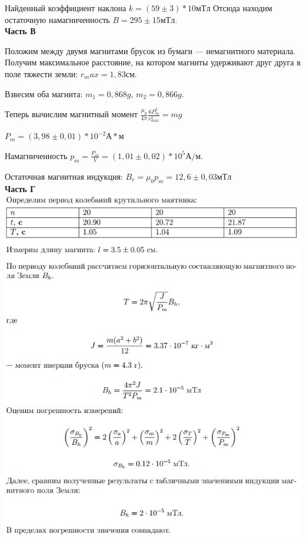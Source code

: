 \documentclass[12pt]{article}
\begin{document}
    Найденный коэффициент наклона $k = (59 \pm 3)*10 мТл$
    Отсюда находим остаточную намагниченность $B = 295 \pm 15 мТл$.\\
    
    \textbf{\large Часть В}
    
    Положим между двумя магнитами брусок из бумаги — немагнитного материала.
    Получим максимальное расстояние, на котором магниты удерживают друг друга
    в поле тяжести земли: $r_max = 1,83 см$.
    
    Взвесим оба магнита: $m_1 = 0,868 g$, $m_2 = 0,866 g$.
    
    Теперь вычислим магнитный момент $\frac{\mu_0}{4\pi}\frac{6P_m^2}{r_{max}^4} = mg$
    
    $P_m = (3,98 \pm 0,01) * 10^{-2} А*м$
    
    Намагниченность $p_m = \frac{P_m}{V} = (1,01 \pm 0,02) * 10^5 А/м$.
    
    Остаточная магнитная индукция: $B_r = \mu_0 p_m = 12,6 \pm 0,03 мТл$\\
    
    \textbf{\large Часть Г}\\
    
    \includegraphics[width=15cm]{res1.png}\\
    \includegraphics[width=15cm]{res2.png}
\end{document}
